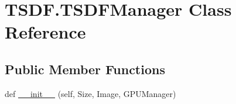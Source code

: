 \hypertarget{class_t_s_d_f_1_1_t_s_d_f_manager}{}\section{T\+S\+D\+F.\+T\+S\+D\+F\+Manager Class Reference}
\label{class_t_s_d_f_1_1_t_s_d_f_manager}
\subsection*{Public Member Functions}
\begin{DoxyCompactItemize}
\item 
def \hyperlink{class_t_s_d_f_1_1_t_s_d_f_manager_aa12aee58f9d79032e2ff5256a1eaba35}{\+\_\+\+\_\+init\+\_\+\+\_\+} (self, Size, Image, G\+P\+U\+Manager)
\end{DoxyCompactItemize}
